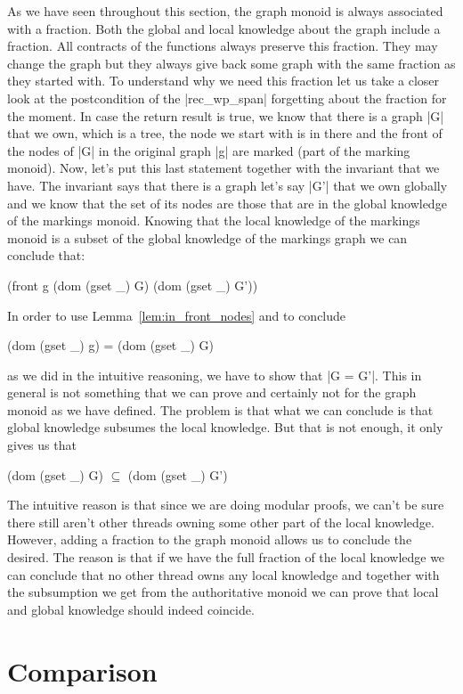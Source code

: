 \documentclass[nocopyrightspace]{sigplanconf}
\begin{document}
As we have seen throughout this section, the graph monoid is always
associated with a fraction.
Both the global and local knowledge about the graph include a fraction.
All contracts of the functions always preserve this fraction.
They may change the graph but they always give back some graph with
the same fraction as they started with.
To understand why we need this fraction let us take a closer look at the
postcondition of the \Coqe|rec_wp_span| forgetting about the fraction for
the moment.
In case the return result is true, we know that there is a graph \Coqe|G|
that we own, which is a tree, the node we start with is in there and
the front of the nodes of \Coqe|G| in the original graph \Coqe|g| are marked (part of the marking monoid).
Now, let's put this last statement together with the invariant that we have.
The invariant says that there is a graph let's say \Coqe|G'| that we own
globally and we know that the set of its nodes are those that are
in the global knowledge of the markings monoid.
Knowing that the local knowledge of the markings monoid is a subset of
the global knowledge of the markings graph we can conclude that:
\begin{Coq}
(front g (dom (gset _) G) (dom (gset _) G'))
\end{Coq}
In order to use Lemma~\ref{lem:in_front_nodes} and to conclude
\begin{Coq}
(dom (gset _) g) = (dom (gset _) G)
\end{Coq}
as we did in the intuitive reasoning, we have to show that \Coqe|G = G'|.
This in general is not something that we can prove and certainly not for
the graph monoid as we have defined.
The problem is that what we can conclude is that global knowledge
subsumes the local knowledge.
But that is not enough, it only gives us that 
\begin{Coq}
(dom (gset _) G) $\subseteq$ (dom (gset _) G')
\end{Coq}
The intuitive reason is that since we are doing modular proofs, we can't
be sure there still aren't other threads owning some other part of the
local knowledge.
However, adding a fraction to the graph monoid allows us to conclude
the desired.
The reason is that if we have the full fraction of the local knowledge
we can conclude that no other thread owns any local knowledge and
together with the subsumption we get from the authoritative monoid
we can prove that local and global knowledge should indeed coincide.

\section{Comparison}
\end{document}
